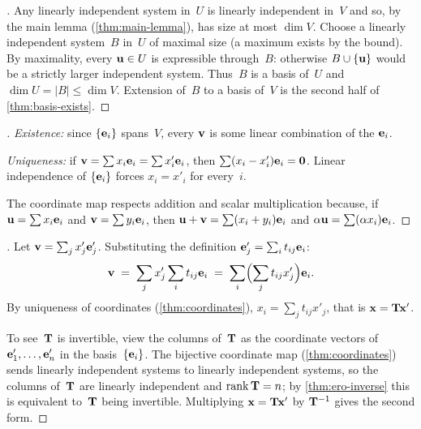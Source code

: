 \begin{proof}[]
Any linearly independent system in~$U$ is linearly independent in~$V$
and so, by the main lemma (\cref{thm:main-lemma}), has size at most
$\dim V$. Choose a linearly independent system~$B$ in~$U$ of maximal
size (a maximum exists by the bound). By maximality, every
$\mathbf{u} \in U$ is expressible through~$B$: otherwise
$B \cup \{\mathbf{u}\}$ would be a strictly larger independent system.
Thus~$B$ is a basis of~$U$ and $\dim U = |B| \le \dim V$. Extension
of~$B$ to a basis of~$V$ is the second half of
\cref{thm:basis-exists}.
\end{proof}

\begin{proof}[]
\emph{Existence:} since $\{\mathbf{e}_i\}$ spans~$V$, every $\mathbf{v}$
is some linear combination of the $\mathbf{e}_i$.

\emph{Uniqueness:} if $\mathbf{v} = \sum x_i \mathbf{e}_i = \sum x'_i \mathbf{e}_i$,
then $\sum (x_i - x'_i) \mathbf{e}_i = \mathbf{0}$. Linear independence of
$\{\mathbf{e}_i\}$ forces $x_i = x'_i$ for every~$i$.

The coordinate map respects addition and scalar multiplication
because, if $\mathbf{u} = \sum x_i \mathbf{e}_i$ and $\mathbf{v} = \sum y_i \mathbf{e}_i$,
then $\mathbf{u} + \mathbf{v} = \sum(x_i + y_i)\mathbf{e}_i$ and
$\alpha \mathbf{u} = \sum (\alpha x_i)\mathbf{e}_i$.
\end{proof}

\begin{proof}[]
Let $\mathbf{v} = \sum_j x'_j \mathbf{e}'_j$. Substituting the definition
$\mathbf{e}'_j = \sum_i t_{ij}\mathbf{e}_i$:
\[
  \mathbf{v} \;=\; \sum_j x'_j \sum_i t_{ij}\mathbf{e}_i
  \;=\; \sum_i \Bigl( \sum_j t_{ij} x'_j \Bigr) \mathbf{e}_i.
\]
By uniqueness of coordinates (\cref{thm:coordinates}),
$x_i = \sum_j t_{ij} x'_j$, that is $\mathbf{x} = \mathbf{T}\mathbf{x}'$.

To see~$\mathbf{T}$ is invertible, view the columns of~$\mathbf{T}$ as the
coordinate vectors of $\mathbf{e}'_1, \dots, \mathbf{e}'_n$ in the
basis~$\{\mathbf{e}_i\}$. The bijective coordinate map
(\cref{thm:coordinates}) sends linearly independent systems to
linearly independent systems, so the columns of~$\mathbf{T}$ are
linearly independent and $\operatorname{rank} \mathbf{T} = n$; by
\cref{thm:ero-inverse} this is equivalent to~$\mathbf{T}$ being
invertible. Multiplying $\mathbf{x} = \mathbf{T}\mathbf{x}'$ by
$\mathbf{T}^{-1}$ gives the second form.
\end{proof}

